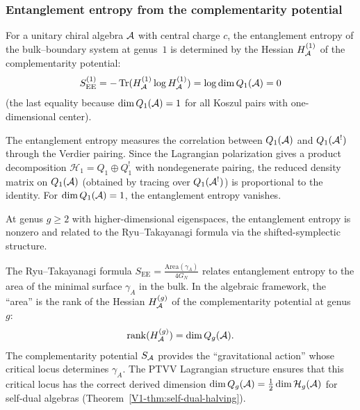 \subsubsection{Entanglement entropy from the complementarity
potential}

\begin{proposition}
For a unitary chiral algebra $\mathcal{A}$ with central charge $c$,
the entanglement entropy of the bulk--boundary system at genus~$1$
is determined by the Hessian $H_{\mathcal{A}}^{(1)}$ of the
complementarity potential:
\begin{equation}%
S_{\mathrm{EE}}^{(1)}
= -\Tr(H_\cA^{(1)} \log H_\cA^{(1)})
= \log \dim Q_1(\cA)
= 0
\end{equation}
\textup{(}the last equality because $\dim Q_1(\mathcal{A}) = 1$
for all Koszul pairs with one-dimensional center\textup{)}.
\end{proposition}

\begin{remark}[Evidence]
The entanglement entropy measures the correlation between
$Q_1(\mathcal{A})$ and $Q_1(\mathcal{A}^!)$ through the Verdier pairing.
Since the Lagrangian polarization gives a product
decomposition $\mathcal{H}_1 = Q_1 \oplus Q_1^!$
with nondegenerate pairing, the reduced density matrix on
$Q_1(\mathcal{A})$ (obtained by tracing over $Q_1(\mathcal{A}^!)$) is
proportional to the identity. For
$\dim Q_1(\mathcal{A}) = 1$, the entanglement entropy vanishes.

At genus $g \ge 2$ with higher-dimensional eigenspaces,
the entanglement entropy is nonzero and related to the
Ryu--Takayanagi formula \cite{Ryu-Takayanagi06} via
the shifted-symplectic structure.
\end{remark}

\begin{remark}
The Ryu--Takayanagi formula
$S_{\mathrm{EE}} = \frac{\mathrm{Area}(\gamma_A)}{4G_N}$
relates entanglement entropy to the area of the minimal
surface $\gamma_A$ in the bulk. In the algebraic framework,
the ``area'' is the rank of the Hessian $H_{\mathcal{A}}^{(g)}$ of
the complementarity potential at genus $g$:
\[
\operatorname{rank}(H_{\mathcal{A}}^{(g)}) = \dim Q_g(\mathcal{A}).
\]
The complementarity potential $S_{\mathcal{A}}$ provides the
``gravitational action'' whose critical locus determines
$\gamma_A$. The PTVV Lagrangian structure ensures that
this critical locus has the correct derived dimension
$\dim Q_g(\mathcal{A}) = \tfrac{1}{2} \dim \mathcal{H}_g(\mathcal{A})$
for self-dual algebras
(Theorem~\ref{V1-thm:self-dual-halving}).
\end{remark}

